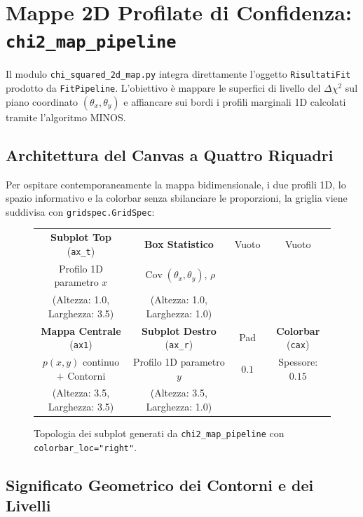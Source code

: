 \documentclass[11pt,a4paper]{article}
\begin{document}
\section{Mappe 2D Profilate di Confidenza: \texttt{chi2\_map\_pipeline}}

Il modulo \texttt{chi\_squared\_2d\_map.py} integra direttamente l'oggetto \texttt{RisultatiFit} prodotto da \texttt{FitPipeline}. L'obiettivo è mappare le superfici di livello del $\Delta\chi^2$ sul piano coordinato $(\theta_x, \theta_y)$ e affiancare sui bordi i profili marginali 1D calcolati tramite l'algoritmo MINOS.

\subsection{Architettura del Canvas a Quattro Riquadri}

Per ospitare contemporaneamente la mappa bidimensionale, i due profili 1D, lo spazio informativo e la colorbar senza sbilanciare le proporzioni, la griglia viene suddivisa con \texttt{gridspec.GridSpec}:

\begin{figure}[htbp]
\centering
\small
\begin{tabular}{|c|c|c|c|}
\hline
\textbf{Subplot Top} (\texttt{ax\_t}) & \textbf{Box Statistico} & Vuoto & Vuoto \\
Profilo 1D parametro $x$ & $\operatorname{Cov}(\theta_x, \theta_y)$, $\rho$ & & \\
(Altezza: 1.0, Larghezza: 3.5) & (Altezza: 1.0, Larghezza: 1.0) & & \\
\hline
\textbf{Mappa Centrale} (\texttt{ax1}) & \textbf{Subplot Destro} (\texttt{ax\_r}) & Pad & \textbf{Colorbar} (\texttt{cax}) \\
$p(x, y)$ continuo $+$ Contorni & Profilo 1D parametro $y$ & $0.1$ & Spessore: $0.15$ \\
(Altezza: 3.5, Larghezza: 3.5) & (Altezza: 3.5, Larghezza: 1.0) & & \\
\hline
\end{tabular}
\caption{Topologia dei subplot generati da \texttt{chi2\_map\_pipeline} con \texttt{colorbar\_loc="right"}.}
\end{figure}

\subsection{Significato Geometrico dei Contorni e dei Livelli}
\end{document}
